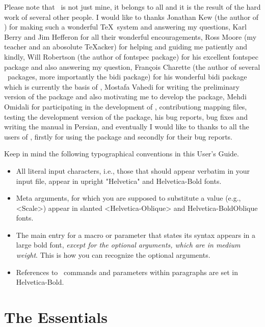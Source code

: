 Please note that \XePersian\ is not just mine, it belongs to all and it is the result of the hard work of several other people. I would like to thanks \textsf{Jonathan Kew} (the author of \XeTeX) for making such a wonderful \TeX\ system and answering my questions, \textsf{Karl Berry} and \textsf{Jim Hefferon} for all their wonderful encouragements, \textsf{Ross Moore} (my teacher and an abosolute \TeX acker) for helping and guiding me patiently and kindly, \textsf{Will Robertson} (the author of \textsf{fontspec} package) for his excellent \textsf{fontspec} package and also answering my question, \textsf{François Charette} (the author of several \XeLaTeX\ packages, more importantly the \textsf{bidi} package) for his wonderful \textsf{bidi} package which is currently the basis of \XePersian , \textsf{Mostafa Vahedi} for writing the preliminary version of the package and also motivating me to develop the package, \textsf{Mehdi Omidali} for participating in the development of \XePersian , contributiong mapping files, testing the development version of the package, his bug reports, bug fixes and writing the manual in Persian, and eventually I would like to thanks to all the users of \XePersian, firstly for using the package and secondly for their bug reports.



\begin{Warning}
Keep in mind the following typographical conventions in this User's Guide.
\begin{itemize}
  \item All literal input characters, i.e., those that should appear verbatim
  in your input file, appear in upright "Helvetica" and {\UsageFont
  Helvetica-Bold} fonts.
  \item Meta arguments, for which you are supposed to substitute a value
  (e.g., <Scale>) appear in slanted <Helvetica-Oblique> and
  {\UsageFont\MetaFont Helvetica-BoldOblique} fonts.
  \item The main entry for a macro or parameter that states its syntax appears
  in a large bold font, \emph{except for the optional arguments, which are in
    medium weight}. This is how you can recognize the optional arguments.
  \item References to \XePersian\ commands and parameters within paragraphs are
  set in {\UsageFont Helvetica-Bold}.

\end{itemize}
\end{Warning}
\part{The Essentials}
